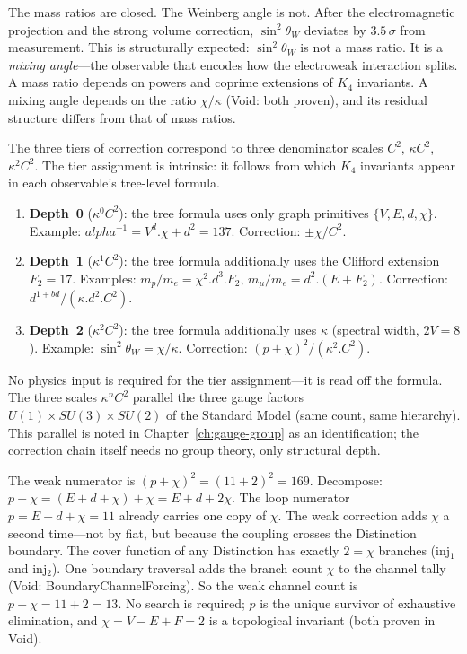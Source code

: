 \documentclass[11pt,a4paper]{book}
\def\alpha{alpha}%
\def\cdot{.}%
\def\mathrm#1{#1}%
\def\texttt#1{#1}%
\begin{document}
The mass ratios are closed.  The Weinberg angle is not.  After the
electromagnetic projection and the strong volume correction,
$\sin^2\!\theta_W$ deviates by $3.5\,\sigma$ from measurement.
This is structurally expected: $\sin^2\!\theta_W$ is not a mass ratio.
It is a \emph{mixing angle}---the observable that encodes how the
electroweak interaction splits.  A mass ratio depends on powers and
coprime extensions of $K_4$ invariants.  A mixing angle depends on
the ratio $\chi/\kappa$ (Void: both proven), and its residual structure
differs from that of mass ratios.

The three tiers of correction correspond to three
denominator scales $C^2$, $\kappa C^2$, $\kappa^2 C^2$.
The tier assignment is intrinsic: it follows from which $K_4$
invariants appear in each observable's tree-level formula.
\begin{enumerate}
\item \textbf{Depth~0} ($\kappa^0 C^2$): the tree formula
      uses only graph primitives $\{V, E, d, \chi\}$.
      Example: $\alpha^{-1} = V^d \cdot \chi + d^2 = 137$.
      Correction: $\pm\chi/C^2$.
\item \textbf{Depth~1} ($\kappa^1 C^2$): the tree formula
      additionally uses the Clifford extension $F_2 = 17$.
      Examples: $m_p/m_e = \chi^2 \cdot d^3 \cdot F_2$,
      $m_\mu/m_e = d^2 \cdot (E + F_2)$.
      Correction: $d^{1+bd}/(\kappa \cdot d^2 \cdot C^2)$.
\item \textbf{Depth~2} ($\kappa^2 C^2$): the tree formula
      additionally uses $\kappa$ (spectral width, $2V = 8$).
      Example: $\sin^2\!\theta_W = \chi/\kappa$.
      Correction: $(p + \chi)^2/(\kappa^2 \cdot C^2)$.
\end{enumerate}
No physics input is required for the tier assignment---it is read
off the formula.  The three scales $\kappa^n C^2$ parallel the
three gauge factors $\mathrm{U}(1) \times \mathrm{SU}(3) \times
\mathrm{SU}(2)$ of the Standard Model (same count, same hierarchy).
This parallel is noted in Chapter~\ref{ch:gauge-group} as an
identification; the correction chain itself needs no group theory,
only structural depth.

The weak numerator is $(p + \chi)^2 = (11 + 2)^2 = 169$.
Decompose:\ $p + \chi = (E + d + \chi) + \chi = E + d + 2\chi$.
The loop numerator $p = E + d + \chi = 11$ already carries one copy
of $\chi$.  The weak correction adds $\chi$ a second time---not
by fiat, but because the coupling crosses the Distinction boundary.
The cover function of any Distinction has exactly $2 = \chi$ branches
(\texttt{inj}$_1$ and \texttt{inj}$_2$).  One boundary traversal adds
the branch count $\chi$ to the channel tally
(Void: \texttt{BoundaryChannelForcing}).
So the weak channel count is $p + \chi = 11 + 2 = 13$.
No search is required; $p$ is the unique survivor of exhaustive
elimination, and $\chi = V - E + F = 2$ is a topological invariant
(both proven in Void).
\end{document}

